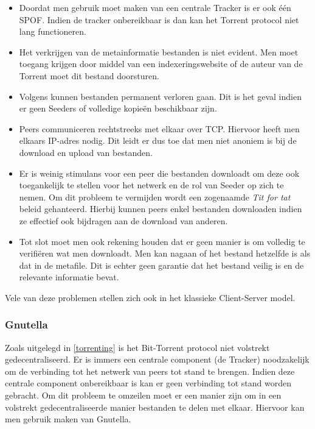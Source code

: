 \begin{itemize}
\item Doordat men gebruik moet maken van een centrale Tracker is er ook één SPOF. Indien de tracker onbereikbaar is dan kan het Torrent protocol niet lang functioneren.\\

\item Het verkrijgen van de metainformatie bestanden is niet evident. Men moet toegang krijgen door middel van een indexeringswebsite of de auteur van de Torrent moet dit bestand doorsturen.\\

\item Volgens \textcite{Thanekar2010} kunnen bestanden permanent verloren gaan. Dit is het geval indien er geen Seeders of volledige kopieën beschikbaar zijn.\\

\item Peers communiceren rechtstreeks met elkaar over TCP. Hiervoor heeft men elkaars IP-adres nodig. Dit leidt er dus toe dat men niet anoniem is bij de download en upload van bestanden.\\

\item Er is weinig stimulans voor een peer die bestanden downloadt om deze ook toegankelijk te stellen voor het netwerk en de rol van Seeder op zich te nemen. Om dit probleem te vermijden wordt een zogenaamde \textit{Tit for tat} beleid gehanteerd. Hierbij kunnen peers enkel bestanden downloaden indien ze effectief ook bijdragen aan de download van anderen.\\

\item Tot slot moet men ook rekening houden dat er geen manier is om volledig te verifiëren wat men downloadt. Men kan nagaan of het bestand hetzelfde is als dat in de metafile. Dit is echter geen garantie dat het bestand veilig is en de relevante informatie bevat. 
\end{itemize}

Vele van deze problemen stellen zich ook in het klassieke Client-Server model.

\subsubsection{Gnutella}
\label{Gnutella}
Zoals uitgelegd in \ref{torrenting} is het Bit-Torrent protocol niet volstrekt gedecentraliseerd. Er is immers een centrale component (de Tracker) noodzakelijk om de verbinding tot het netwerk van peers tot stand te brengen. Indien deze centrale component onbereikbaar is kan er geen verbinding tot stand worden gebracht. Om dit probleem te omzeilen moet er een manier zijn om in een volstrekt gedecentraliseerde manier bestanden te delen met elkaar. Hiervoor kan men gebruik maken van Gnutella.\\

